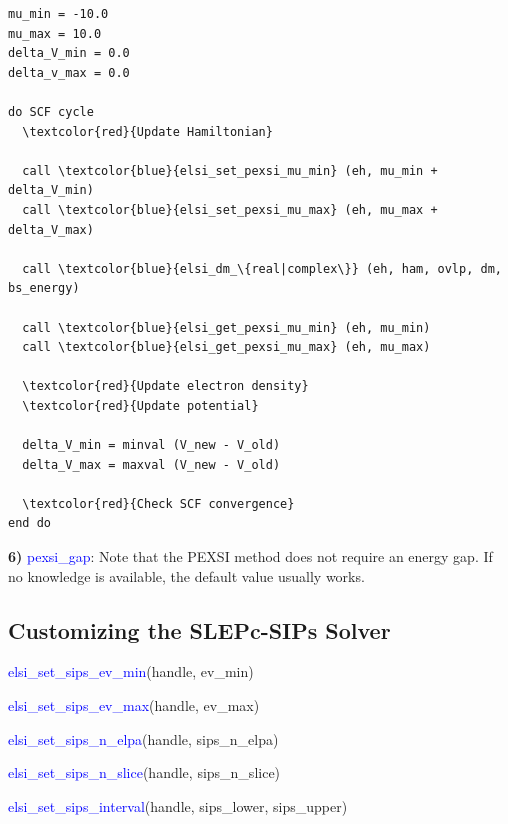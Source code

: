 \documentclass{report}
\begin{document}
\begin{tcolorbox}
\begin{Verbatim}[commandchars=\\\{\}]
mu_min = -10.0
mu_max = 10.0
delta_V_min = 0.0
delta_v_max = 0.0

do SCF cycle
  \textcolor{red}{Update Hamiltonian}

  call \textcolor{blue}{elsi_set_pexsi_mu_min} (eh, mu_min + delta_V_min)
  call \textcolor{blue}{elsi_set_pexsi_mu_max} (eh, mu_max + delta_V_max)

  call \textcolor{blue}{elsi_dm_\{real|complex\}} (eh, ham, ovlp, dm, bs_energy)

  call \textcolor{blue}{elsi_get_pexsi_mu_min} (eh, mu_min)
  call \textcolor{blue}{elsi_get_pexsi_mu_max} (eh, mu_max)

  \textcolor{red}{Update electron density}
  \textcolor{red}{Update potential}

  delta_V_min = minval (V_new - V_old)
  delta_V_max = maxval (V_new - V_old)

  \textcolor{red}{Check SCF convergence}
end do
\end{Verbatim}
\end{tcolorbox}

\textbf{6)} \textcolor{blue}{pexsi\_gap}:  Note that the PEXSI method does not require an energy gap.  If no knowledge is available, the default value usually works.

\subsection{Customizing the SLEPc-SIPs Solver}
\label{subsec:setter_sips}
\begin{labeling}{\hspace{6cm}}
\item [\hspace{0.3cm} \textcolor{blue}{elsi\_set\_sips\_ev\_min}(handle, ev\_min)]
\item [\hspace{0.3cm} \textcolor{blue}{elsi\_set\_sips\_ev\_max}(handle, ev\_max)]
\item [\hspace{0.3cm} \textcolor{blue}{elsi\_set\_sips\_n\_elpa}(handle, sips\_n\_elpa)]
\item [\hspace{0.3cm} \textcolor{blue}{elsi\_set\_sips\_n\_slice}(handle, sips\_n\_slice)]
\item [\hspace{0.3cm} \textcolor{blue}{elsi\_set\_sips\_interval}(handle, sips\_lower, sips\_upper)]
\end{labeling}
\end{document}
